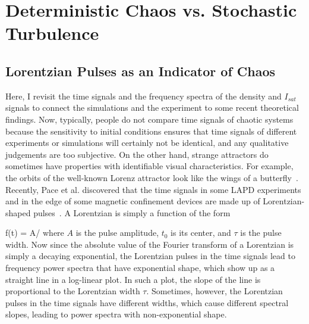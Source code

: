 \chapter{Deterministic Chaos vs. Stochastic Turbulence}
\label{c_chaos}

\section{Lorentzian Pulses as an Indicator of Chaos}
\label{s_lorentzian_pulses}


Here, I revisit the time signals and the frequency spectra of the density and $I_{sat}$ signals to connect the simulations and the experiment to some recent theoretical findings. 
Now, typically, people do not compare time signals of chaotic systems because the sensitivity
to initial conditions ensures that time signals of different experiments or simulations will certainly not be identical, and any qualitative judgements are too subjective. On the other hand,
strange attractors do sometimes have properties with identifiable visual characteristics. For example, the orbits of the well-known Lorenz attractor look like the wings of a butterfly~\cite{lorenz1963}.
Recently, Pace et al. discovered that the time signals in some LAPD experiments and in the edge of some magnetic confinement devices
are made up of Lorentzian-shaped pulses~\cite{pace2008a,pace2008b}. A Lorentzian is simply a function of the form

\beq
\label{lorentz_eqn}
f(t) = A/
\eeq
where $A$ is the pulse amplitude, $t_0$ is its center, and $\tau$ is the pulse width. Now since the absolute value of the Fourier transform of a Lorentzian is simply a decaying exponential,
the Lorentzian pulses in the time signals lead to frequency power spectra that have exponential shape, which show up as a straight line in a log-linear plot. In such a plot, the slope of the line
is proportional to the Lorentzian width $\tau$. Sometimes, however, the Lorentzian
pulses in the time signals have different widths, which cause different spectral slopes, leading to power spectra with non-exponential shape. 


